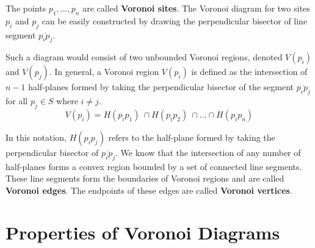 \documentclass[12pt]{article}
\begin{document}
    The points $p_1, \ldots, p_n$ are called {\bf Voronoi sites}.  The
    Voronoi diagram for two sites $p_i$ and $p_j$ can be easily
    constructed by drawing the perpendicular bisector of line segment
    $\overline{p_i p_j}$.

        \begin{center}
        \end{center}

    Such a diagram would consist of two unbounded Voronoi regions, denoted
    $V(p_i)$ and $V(p_j)$.  In general, a Voronoi region $V(p_i)$ is
    defined as the intersection of $n-1$ half-planes formed by taking the
    perpendicular bisector of the segment $\overline{p_i p_j}$ for all
    $p_j \in S$ where $i \neq j$.
    \[ V(p_i) = H(p_i p_1) \ \cap H(p_i p_2) \ \cap \ldots \cap
    H(p_i p_n) \]

        \begin{center}
        \end{center}

    In this notation, $H(p_i p_j)$ refers to the half-plane formed by
    taking the perpendicular bisector of $\overline{p_i p_j}$.  We know
    that the intersection of any number of half-planes forms a convex
    region bounded by a set of connected line segments. These line
    segments form the boundaries of Voronoi regions and are called {\bf
    Voronoi edges}.  The endpoints of these edges are called {\bf Voronoi
    vertices}.

\section{Properties of Voronoi Diagrams}
\end{document}
